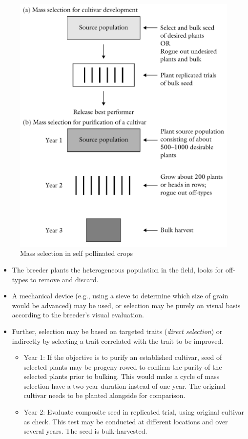 \documentclass[11pt,ignorenonframetext,aspectratio=169]{beamer}
\providecommand{\tightlist}{%
  \setlength{\itemsep}{0pt}\setlength{\parskip}{0pt}}
\begin{document}
\begin{frame}{}
\protect\hypertarget{section-2}{}
\begin{figure}

{\centering \includegraphics[width=0.55\linewidth]{./images/mass_selection} 

}

\caption{Mass selection in self pollinated crops}\label{fig:mass-selection}
\end{figure}
\end{frame}

\begin{frame}{}
\protect\hypertarget{section-3}{}
\begin{itemize}
\tightlist
\item
  The breeder plants the heterogeneous population in the field, looks
  for off-types to remove and discard.
\item
  A mechanical device (e.g., using a sieve to determine which size of
  grain would be advanced) may be used, or selection may be purely on
  visual basis according to the breeder's visual evaluation.
\item
  Further, selection may be based on targeted traits (\emph{direct
  selection}) or indirectly by selecting a trait correlated with the
  trait to be improved.

  \begin{itemize}
  \tightlist
  \item
    Year 1: If the objective is to purify an established cultivar, seed
    of selected plants may be progeny rowed to confirm the purity of the
    selected plants prior to bulking. This would make a cycle of mass
    selection have a two-year duration instead of one year. The original
    cultivar needs to be planted alongside for comparison.
  \item
    Year 2: Evaluate composite seed in replicated trial, using original
    cultivar as check. This test may be conducted at different locations
    and over several years. The seed is bulk-harvested.
  \end{itemize}
\end{itemize}
\end{frame}
\end{document}
